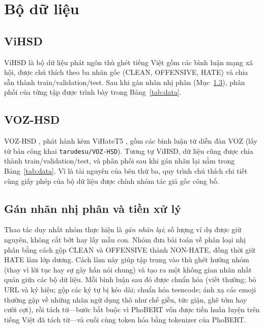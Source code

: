 \documentclass[11pt]{article}
\begin{document}
\section{Bộ dữ liệu}

\subsection{ViHSD}
ViHSD \citep{vihsd} là bộ dữ liệu phát ngôn thù ghét tiếng Việt gồm các bình luận mạng xã hội, được chú thích theo ba nhãn gốc (CLEAN, OFFENSIVE, HATE) và chia sẵn thành train/validation/test. Sau khi gán nhãn nhị phân (Mục~\ref{sec:reshape}), phân phối của từng tập được trình bày trong Bảng~\ref{tab:data}.

\subsection{VOZ-HSD}
VOZ-HSD \citep{vozhsd}, phát hành kèm ViHateT5 \citep{vihatet5}, gồm các bình luận từ diễn đàn VOZ (lấy từ bản công khai \texttt{tarudesu/VOZ-HSD}). Tương tự ViHSD, dữ liệu cũng được chia thành train/validation/test, và phân phối sau khi gán nhãn lại nằm trong Bảng~\ref{tab:data}. Vì là tài nguyên của bên thứ ba, quy trình chú thích chi tiết cùng giấy phép của bộ dữ liệu được chính nhóm tác giả gốc công bố.

\subsection{Gán nhãn nhị phân và tiền xử lý}
\label{sec:reshape}
Thao tác duy nhất nhóm thực hiện là \emph{gán nhãn lại}; số lượng ví dụ được giữ nguyên, không cắt bớt hay lấy mẫu con. Nhóm đưa bài toán về phân loại nhị phân bằng cách gộp CLEAN và OFFENSIVE thành NON-HATE, đồng thời giữ HATE làm lớp dương. Cách làm này giúp tập trung vào thù ghét hướng nhóm (thay vì lời tục hay sự gây hấn nói chung) và tạo ra một không gian nhãn nhất quán giữa các bộ dữ liệu. Mỗi bình luận sau đó được chuẩn hóa (viết thường; bỏ URL và ký hiệu; gộp các ký tự bị kéo dài; chuẩn hóa teencode; ánh xạ các emoji thường gặp về những nhãn ngữ dụng thô như chế giễu, tức giận, ghê tởm hay cười cợt), rồi tách từ---bước bắt buộc vì PhoBERT vốn được tiền huấn luyện trên tiếng Việt đã tách từ---và cuối cùng token hóa bằng tokenizer của PhoBERT.
\end{document}
